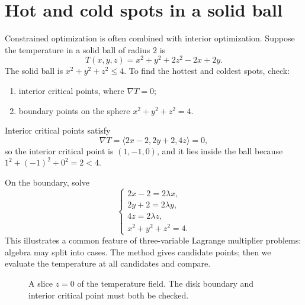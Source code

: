 \documentclass[11pt]{article}
\newcommand{\grad}{\nabla}
\begin{document}
\section{Hot and cold spots in a solid ball}

Constrained optimization is often combined with interior optimization. Suppose the temperature in a solid ball of radius $2$ is
\[
T(x,y,z)=x^2+y^2+2z^2-2x+2y.
\]
The solid ball is $x^2+y^2+z^2\le 4$. To find the hottest and coldest spots, check:
\begin{enumerate}
  \item interior critical points, where $\grad T=0$;
  \item boundary points on the sphere $x^2+y^2+z^2=4$.
\end{enumerate}
Interior critical points satisfy
\[
\grad T=\langle 2x-2,2y+2,4z\rangle=0,
\]
so the interior critical point is $(1,-1,0)$, and it lies inside the ball because $1^2+(-1)^2+0^2=2<4$.

On the boundary, solve
\[
\begin{cases}
2x-2=2\lambda x,\\
2y+2=2\lambda y,\\
4z=2\lambda z,\\
x^2+y^2+z^2=4.
\end{cases}
\]
This illustrates a common feature of three-variable Lagrange multiplier problems: algebra may split into cases. The method gives candidate points; then we evaluate the temperature at all candidates and compare.

\begin{figure}[H]
\centering
{}
\caption{A slice $z=0$ of the temperature field. The disk boundary and interior critical point must both be checked.}
\end{figure}
\end{document}
